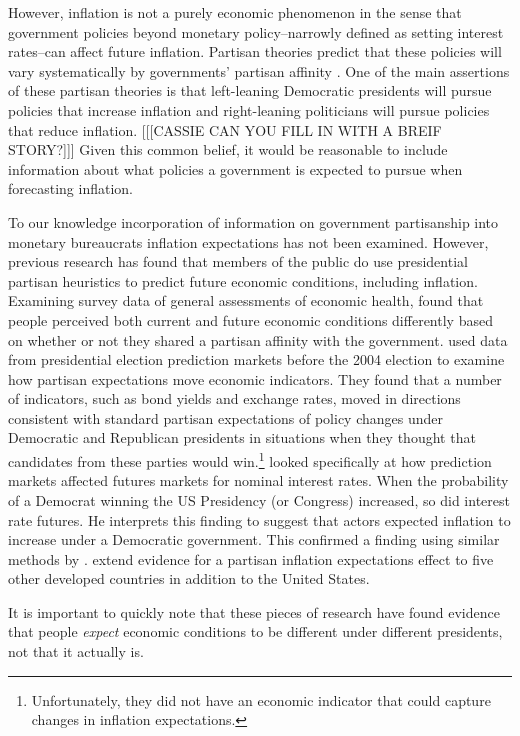 \documentclass[a4paper]{article}
\begin{document}
However, inflation is not a purely economic phenomenon in the sense that government policies beyond monetary policy--narrowly defined as setting interest rates--can affect future inflation. Partisan theories predict that these policies will vary systematically by governments' partisan affinity \citep{Samuelson1977,HibbsJr1977}. One of the main assertions of these partisan theories is that left-leaning Democratic presidents will pursue policies that increase inflation and right-leaning politicians will pursue policies that reduce inflation. [[[CASSIE CAN YOU FILL IN WITH A BREIF STORY?]]] Given this common belief, it would be reasonable to include information about what policies a government is expected to pursue when forecasting inflation.

To our knowledge incorporation of information on government partisanship into monetary bureaucrats inflation expectations has not been examined. However, previous research has found that members of the public do use presidential partisan heuristics to predict future economic conditions, including inflation. Examining survey data of general assessments of economic health, \cite{Duch2000} found that people perceived both current and future economic conditions differently based on whether or not they shared a partisan affinity with the government. \cite{Snowberg2007} used data from presidential election prediction markets before the 2004 election to examine how partisan expectations move economic indicators. They found that a number of indicators, such as bond yields and exchange rates, moved in directions consistent with standard partisan expectations of policy changes under Democratic and Republican presidents in situations when they thought that candidates from these parties would win.\footnote{Unfortunately, they did not have an economic indicator that could capture changes in inflation expectations.} \cite{Fowler2006} looked specifically at how prediction markets affected futures markets for nominal interest rates. When the probability of a Democrat winning the US Presidency (or Congress) increased, so did interest rate futures. He interprets this finding to suggest that actors expected inflation to increase under a Democratic government. This confirmed a finding using similar methods by \cite{Alesina1997}. \cite{Berlemann2006} extend evidence for a partisan inflation expectations effect to five other developed countries in addition to the United States.

It is important to quickly note that these pieces of research have found evidence that people \emph{expect} economic conditions to be different under different presidents, not that it actually is.
\end{document}
